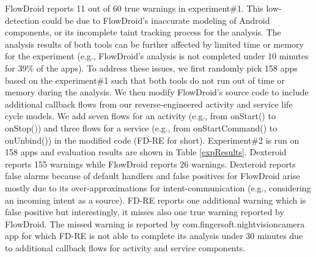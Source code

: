 \documentclass[10pt]{elsarticle}
\begin{document}
FlowDroid reports 11 out of 60 true warnings in experiment\#1. This low-detection could be due to FlowDroid's inaccurate modeling of Android components, or its incomplete taint tracking process for the analysis. The analysis results of both tools can be further affected by limited time or memory for the experiment \cite{FDMailing}(e.g., FlowDroid's analysis is not completed under 10 minutes for 39\% of the apps). To address these issues, we first randomly pick 158 apps based on the experiment\#1 such that both tools do not run out of time or memory during the analysis. We then modify FlowDroid's source code to include additional callback flows from our reverse-engineered activity and service life cycle models. We add seven flows for an activity (e.g., from {\ttfamily onStart()} to {\ttfamily onStop()}) and three flows for a service (e.g., from {\ttfamily onStartCommand()} to {\ttfamily onUnbind()}) in the modified code (FD-RE for short). Experiment\#2 is run on 158 apps and evaluation results are shown in Table \ref{expResults}. Dexteroid reports 155 warnings while FlowDroid reports 26 warnings. Dexteroid reports false alarms because of default handlers and false positives for FlowDroid arise mostly due to its over-approximations for intent-communication (e.g., considering an incoming intent as a source). FD-RE reports one additional warning which is false positive but interestingly, it misses also one true warning reported by FlowDroid. The missed warning is reported by {\ttfamily com.fingersoft.nightvisioncamera} app for which FD-RE is not able to complete its analysis under 30 minutes due to additional callback flows for activity and service components.
\end{document}
